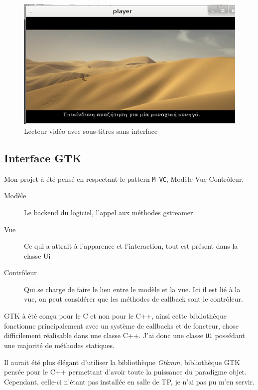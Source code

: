 \documentclass[a4paper, 11pt]{article}
\begin{document}
	\begin{figure}[H]
		\centering
		\includegraphics[width=14cm]{img/2.png}
		\caption{Lecteur vidéo avec sous-titres sans interface}
	\end{figure}
	\subsection{Interface GTK}
	Mon projet à été pensé en respectant le pattern \texttt{M VC}, Modèle Vue-Contrôleur.

	\begin{description}
		\item[Modèle] Le backend du logiciel, l'appel aux méthodes gstreamer.
		\item[Vue] Ce qui a attrait à l'apparence et l'interaction, tout est présent dans la classe Ui
		\item[Contrôleur] Qui se charge de faire le lien entre le modèle et la vue. Ici il est lié à la vue, on peut considérer que les méthodes de callback sont
			le contrôleur.
	\end{description}

	\begin{remarque}
		GTK à été conçu pour le C et non pour le C++, ainsi cette bibliothèque fonctionne principalement avec un système de callbacks et de foncteur, chose
		difficilement réalisable dans une classe C++. J'ai donc une classe \texttt{Ui} possédant une majorité de méthodes statiques. 

		Il aurait été plus élégant d'utiliser la bibliothèque \textit{Gtkmm}, bibliothèque GTK pensée pour le C++ permettant d'avoir toute la puissance du
		paradigme objet. Cependant, celle-ci n'étant pas installée en salle de TP, je n'ai pas pu m'en servir.
	\end{remarque}
\end{document}
